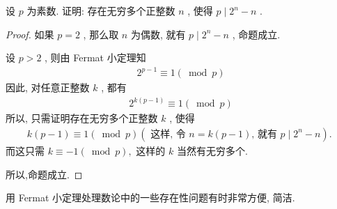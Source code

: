 \begin{example}
	设 $p$ 为素数. 证明: 存在无穷多个正整数 $n$ , 使得 $p \mid 2^{n}-n$ .
\end{example}
\begin{proof}
	如果 $p=2$ , 那么取 $n$ 为偶数, 就有 $p \mid 2^{n}-n$ , 命题成立.

	设 $p>2$ , 则由 Fermat 小定理知
	\begin{align*}
		2^{p-1} \equiv 1(\bmod p)
	\end{align*}
	因此, 对任意正整数 $k$ , 都有
	\begin{align*}
		2^{k(p-1)} \equiv 1(\bmod p)
	\end{align*}
	所以, 只需证明存在无穷多个正整数 $k$ , 使得
	\begin{align*}
		k(p-1) \equiv 1(\bmod p)\left(\text { 这样, 令 } n=k(p-1) \text {, 就有 } p \mid 2^{n}-n\right) \text {. }
	\end{align*}
	而这只需 $k \equiv-1(\bmod p) , $ 这样的 $k$ 当然有无穷多个.

	所以,命题成立.
\end{proof}
\begin{note}
	用 Fermat 小定理处理数论中的一些存在性问题有时非常方便, 简洁.
\end{note}

